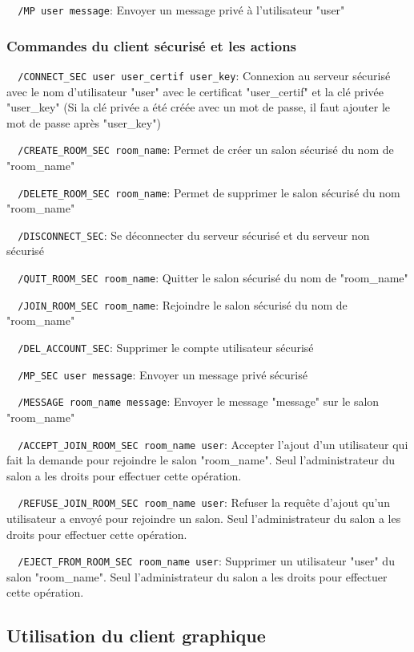 \documentclass[a4paper,11pt,french]{book}
\begin{document}
\verb+	/MP user message+: Envoyer un message privé à l'utilisateur "user"
			
\subsubsection{Commandes du client sécurisé et les actions}

\verb+	/CONNECT_SEC user user_certif user_key+: Connexion au serveur sécurisé avec le nom d'utilisateur "user" avec le certificat "user\_certif" et la clé privée "user\_key" (Si la clé privée a été créée avec un mot de passe, il faut ajouter le mot de passe après "user\_key")

\verb+	/CREATE_ROOM_SEC room_name+: Permet de créer un salon sécurisé du nom de "room\_name"

\verb+	/DELETE_ROOM_SEC room_name+: Permet de supprimer le salon sécurisé du nom "room\_name"

\verb+	/DISCONNECT_SEC+: Se déconnecter du serveur sécurisé et du serveur non sécurisé

\verb+	/QUIT_ROOM_SEC room_name+: Quitter le salon sécurisé du nom de "room\_name"

\verb+	/JOIN_ROOM_SEC room_name+: Rejoindre le salon sécurisé du nom de "room\_name"

\verb+	/DEL_ACCOUNT_SEC+: Supprimer le compte utilisateur sécurisé

\verb+	/MP_SEC user message+: Envoyer un message privé sécurisé

\verb+	/MESSAGE room_name message+: Envoyer le message "message" sur le salon "room\_name"

\verb+	/ACCEPT_JOIN_ROOM_SEC room_name user+: Accepter l'ajout d'un utilisateur qui fait la demande pour rejoindre le salon "room\_name". Seul l'administrateur du salon a les droits pour effectuer cette opération.

\verb+	/REFUSE_JOIN_ROOM_SEC room_name user+: Refuser la requête d'ajout qu'un utilisateur a envoyé pour rejoindre un salon. Seul l'administrateur du salon a les droits pour effectuer cette opération.

\verb+	/EJECT_FROM_ROOM_SEC room_name user+: Supprimer un utilisateur "user" du salon "room\_name". Seul l'administrateur du salon a les droits pour effectuer cette opération.


\subsection{Utilisation du client graphique}
\end{document}
